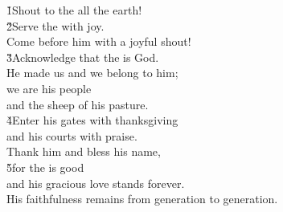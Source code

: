 \begin{poetry}
\poeml \v{1}Shout to the  all the earth! \\
\poeml \v{2}Serve the  with joy. \\
\poemlll       Come before him with a joyful shout! \\
\poeml \v{3}Acknowledge that the  is God. \\
\poemll    He made us and we belong to him; \\
\poeml we are his people \\
\poemll    and the sheep of his pasture. \\
\poeml \v{4}Enter his gates with thanksgiving \\
\poemll    and his courts with praise. \\
\poeml Thank him and bless his name, \\
\poeml \v{5}for the  is good \\
\poemlll       and his gracious love stands forever. \\
\poeml His faithfulness remains from generation to generation.
\end{poetry}

